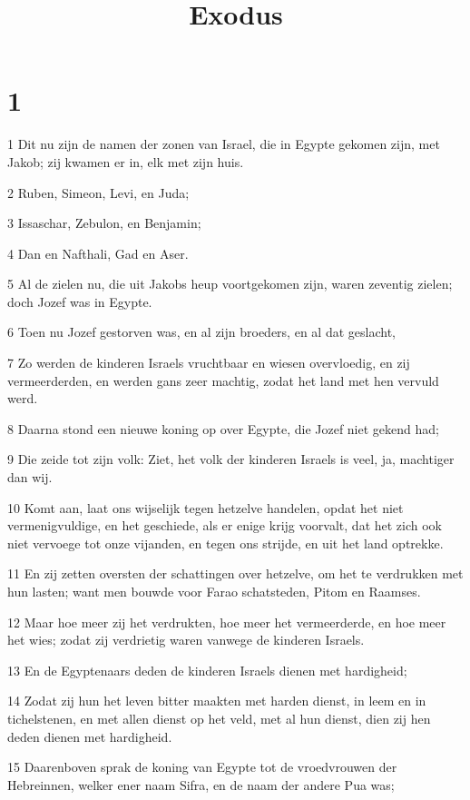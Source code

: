 

\title{Exodus}



\chapter{1}

\par 1 Dit nu zijn de namen der zonen van Israel, die in Egypte gekomen zijn, met Jakob; zij kwamen er in, elk met zijn huis.
\par 2 Ruben, Simeon, Levi, en Juda;
\par 3 Issaschar, Zebulon, en Benjamin;
\par 4 Dan en Nafthali, Gad en Aser.
\par 5 Al de zielen nu, die uit Jakobs heup voortgekomen zijn, waren zeventig zielen; doch Jozef was in Egypte.
\par 6 Toen nu Jozef gestorven was, en al zijn broeders, en al dat geslacht,
\par 7 Zo werden de kinderen Israels vruchtbaar en wiesen overvloedig, en zij vermeerderden, en werden gans zeer machtig, zodat het land met hen vervuld werd.
\par 8 Daarna stond een nieuwe koning op over Egypte, die Jozef niet gekend had;
\par 9 Die zeide tot zijn volk: Ziet, het volk der kinderen Israels is veel, ja, machtiger dan wij.
\par 10 Komt aan, laat ons wijselijk tegen hetzelve handelen, opdat het niet vermenigvuldige, en het geschiede, als er enige krijg voorvalt, dat het zich ook niet vervoege tot onze vijanden, en tegen ons strijde, en uit het land optrekke.
\par 11 En zij zetten oversten der schattingen over hetzelve, om het te verdrukken met hun lasten; want men bouwde voor Farao schatsteden, Pitom en Raamses.
\par 12 Maar hoe meer zij het verdrukten, hoe meer het vermeerderde, en hoe meer het wies; zodat zij verdrietig waren vanwege de kinderen Israels.
\par 13 En de Egyptenaars deden de kinderen Israels dienen met hardigheid;
\par 14 Zodat zij hun het leven bitter maakten met harden dienst, in leem en in tichelstenen, en met allen dienst op het veld, met al hun dienst, dien zij hen deden dienen met hardigheid.
\par 15 Daarenboven sprak de koning van Egypte tot de vroedvrouwen der Hebreinnen, welker ener naam Sifra, en de naam der andere Pua was;
